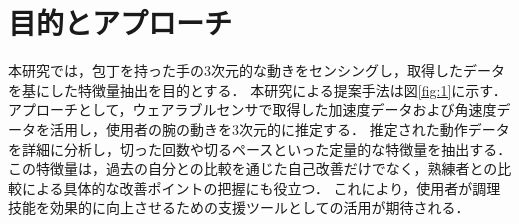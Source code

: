 \section{目的とアプローチ}
本研究では，包丁を持った手の3次元的な動きをセンシングし，取得したデータを基にした特徴量抽出を目的とする．
本研究による提案手法は図\ref{fig:1}に示す．
アプローチとして，ウェアラブルセンサで取得した加速度データおよび角速度データを活用し，使用者の腕の動きを3次元的に推定する．
推定された動作データを詳細に分析し，切った回数や切るペースといった定量的な特徴量を抽出する．
この特徴量は，過去の自分との比較を通じた自己改善だけでなく，熟練者との比較による具体的な改善ポイントの把握にも役立つ．
これにより，使用者が調理技能を効果的に向上させるための支援ツールとしての活用が期待される．